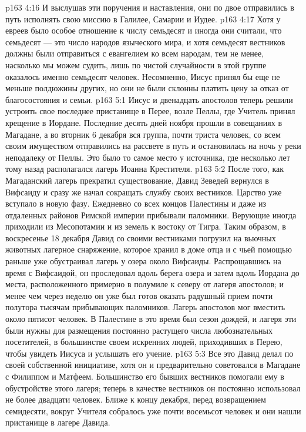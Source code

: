 \vs p163 4:16 \pc И выслушав эти поручения и наставления, они по двое отправились в путь исполнять свою миссию в Галилее, Самарии и Иудее.
\vs p163 4:17 Хотя у евреев было особое отношение к числу семьдесят и иногда они считали, что семьдесят --- это число народов языческого мира, и хотя семьдесят вестников должны были отправиться с евангелием ко всем народам, тем не менее, насколько мы можем судить, лишь по чистой случайности в этой группе оказалось именно семьдесят человек. Несомненно, Иисус принял бы еще не меньше полдюжины других, но они не были склонны платить цену за отказ от благосостояния и семьи.
\vs p163 5:1 Иисус и двенадцать апостолов теперь решили устроить свое последнее пристанище в Перее, возле Пеллы, где Учитель принял крещение в Иордане. Последние десять дней ноября прошли в совещаниях в Магадане, а во вторник 6 декабря вся группа, почти триста человек, со всем своим имуществом отправились на рассвете в путь и остановилась на ночь у реки неподалеку от Пеллы. Это было то самое место у источника, где несколько лет тому назад располагался лагерь Иоанна Крестителя.
\vs p163 5:2 После того, как Магаданский лагерь прекратил существование, Давид Зеведей вернулся в Вифсаиду и сразу же начал сокращать службу своих вестников. Царство уже вступало в новую фазу. Ежедневно со всех концов Палестины и даже из отдаленных районов Римской империи прибывали паломники. Верующие иногда приходили из Месопотамии и из земель к востоку от Тигра. Таким образом, в воскресенье 18 декабря Давид со своими вестниками погрузил на вьючных животных лагерное снаряжение, которое хранил в доме отца и с чьей помощью раньше уже обустраивал лагерь у озера около Вифсаиды. Распрощавшись на время с Вифсаидой, он проследовал вдоль берега озера и затем вдоль Иордана до места, расположенного примерно в полумиле к северу от лагеря апостолов; и менее чем через неделю он уже был готов оказать радушный прием почти полутора тысячам прибывающих паломников. Лагерь апостолов мог вместить около пятисот человек. В Палестине в это время был сезон дождей, и лагеря эти были нужны для размещения постоянно растущего числа любознательных посетителей, в большинстве своем искренних людей, приходивших в Перею, чтобы увидеть Иисуса и услышать его учение.
\vs p163 5:3 Все это Давид делал по своей собственной инициативе, хотя он и предварительно советовался в Магадане с Филиппом и Матфеем. Большинство его бывших вестников помогали ему в обустройстве этого лагеря; теперь в качестве вестников он постоянно использовал не более двадцати человек. Ближе к концу декабря, перед возвращением семидесяти, вокруг Учителя собралось уже почти восемьсот человек и они нашли пристанище в лагере Давида.
